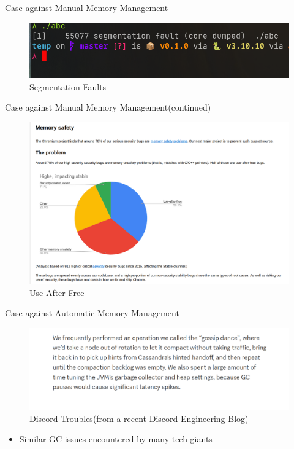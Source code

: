 \documentclass[
  10pt,
  ignorenonframetext,
]{beamer}
\providecommand{\tightlist}{%
  \setlength{\itemsep}{0pt}\setlength{\parskip}{0pt}}
\begin{document}
\begin{frame}{Case against Manual Memory
Management}
\protect\hypertarget{case-against-manual-memory-management}{}
\begin{figure}
\centering
\includegraphics{images/seg_fault.png}
\caption{Segmentation Faults}
\end{figure}
\end{frame}

\begin{frame}{Case against Manual Memory
Management(continued)}
\protect\hypertarget{case-against-manual-memory-managementcontinued}{}
\begin{figure}
\centering
\includegraphics{images/chrome.png}
\caption{Use After Free}
\end{figure}
\end{frame}

\begin{frame}{Case against Automatic Memory
Management}
\protect\hypertarget{case-against-automatic-memory-management}{}
\begin{figure}
\centering
\includegraphics{images/discord_troubles.png}
\caption{Discord Troubles(from a recent Discord
Engineering Blog)}
\end{figure}

\pause

\begin{itemize}
\tightlist
\item
  Similar GC issues encountered by many tech
  giants
\end{itemize}
\end{frame}
\end{document}
